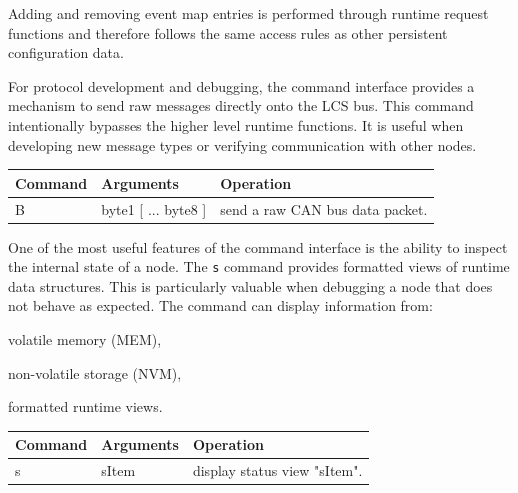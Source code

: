 Adding and removing event map entries is performed through runtime request functions
and therefore follows the same access rules as other persistent configuration data.



For protocol development and debugging, the command interface provides a mechanism to
send raw messages directly onto the LCS bus.
This command intentionally bypasses the higher level runtime functions. It is useful
when developing new message types or verifying communication with other nodes.

\begin{table}[ht!]
    \begin{center}
        \renewcommand{\arraystretch}{1.2}
        \begin{tabularx}{0.9\textwidth}{|l|l|X|}
            \hline
            \textbf{Command} & \textbf{Arguments}  & \textbf{Operation} \\
            \hline
            B & byte1 [ ... byte8 ] & send a raw CAN bus data packet.\\
            \hline
        \end{tabularx}
    \end{center}
\end{table}
\FloatBarrier


One of the most useful features of the command interface is the ability to inspect the
internal state of a node.
The \texttt{s} command provides formatted views of runtime data structures. This is
particularly valuable when debugging a node that does not behave as expected.
The command can display information from:

\begin{smallGapItemize}
    \item volatile memory (MEM),
    \item non-volatile storage (NVM),
    \item formatted runtime views.
\end{smallGapItemize}

\begin{table}[ht!]
    \begin{center}
        \renewcommand{\arraystretch}{1.2}
        \begin{tabularx}{0.9\textwidth}{|l|l|X|}
            \hline
            \textbf{Command} & \textbf{Arguments}  & \textbf{Operation} \\
            \hline
            s & sItem & display status view "sItem".\\
            \hline
        \end{tabularx}
    \end{center}
\end{table}
\FloatBarrier

